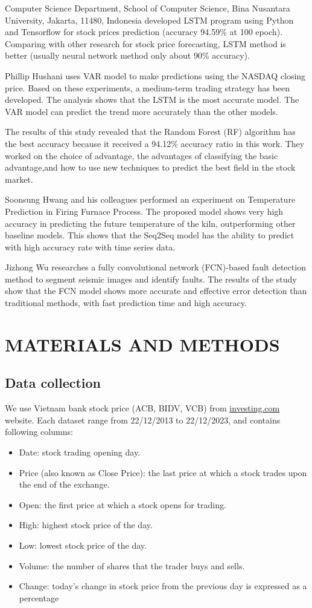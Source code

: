 \documentclass{ieeeojies}
\begin{document}
Computer Science Department, School of Computer Science, Bina Nusantara University, Jakarta, 11480, Indonesia developed LSTM program using Python and Tensorflow for stock prices prediction (accuracy 94.59\% at 100 epoch). Comparing with other research for stock price forecasting, LSTM method is better (usually neural network method only about 90\% accuracy).\cite{a4}

Phillip Hushani uses VAR model to make predictions using the NASDAQ closing price. Based on these experiments, a medium-term trading strategy has been developed. The analysis shows that the LSTM is the most accurate model. The VAR model can predict the trend more accurately than the other models.\cite{a5}

The results of this study revealed that the Random Forest (RF) algorithm has the best accuracy because it received a 94.12\% accuracy ratio in this work. They worked on the choice of advantage, the advantages of classifying the basic advantage,and how to use new techniques to predict the best field in the stock market.\cite{a6}

Soonsung Hwang and his colleagues performed an experiment on Temperature Prediction in Firing Furnace Process. The proposed model shows very high accuracy in predicting the future temperature of the kiln, outperforming other baseline models. This shows that the Seq2Seq model has the ability to predict with high accuracy rate with time series data.\cite{a7}

Jizhong Wu researches a fully convolutional network (FCN)-based fault detection method to segment seismic images and identify faults. The results of the study show that the FCN model shows more accurate and effective error detection than traditional methods, with fast prediction time and high accuracy.\cite{a8}

\section{MATERIALS AND METHODS}
\subsection{Data collection}
\hspace{1em}We use Vietnam bank stock price (ACB, BIDV, VCB) from \href{https://www.investing.com}{investing.com} website. Each dataset range from 22/12/2013 to 22/12/2023, and contains following columns:
\begin{itemize}
    \item Date: stock trading opening day. 
    \item Price (also known as Close Price): the last price at which 
a stock trades upon the end of the exchange. 
    \item Open: the first price at which a stock opens for trading. 
    \item High: highest stock price of the day. 
    \item Low: lowest stock price of the day. 
    \item Volume: the number of shares that the trader buys and 
sells. 
    \item Change: today's change in stock price from the previous 
day is expressed as a percentage
\end{itemize}
\end{document}
